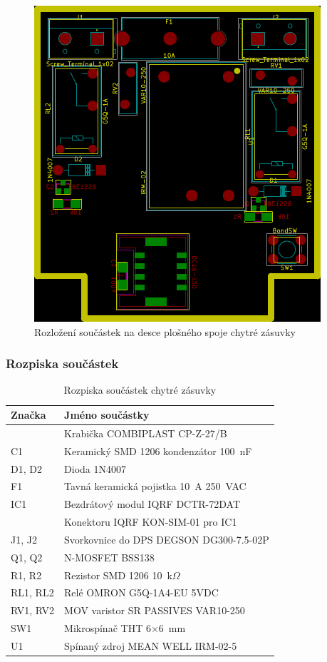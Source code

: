 \documentclass[12pt,a4paper,oneside]{article}
\begin{document}
\begin{figure}[H]
\centering
\label{fig:components}
\includegraphics{img/components.pdf}
\caption{Rozložení součástek na desce plošného spoje chytré zásuvky}
\end{figure}

\newpage

\subsubsection{Rozpiska součástek}

\begin{table}[H]
	\centering
	\begin{tabular}{|l|l|}
		\hline 
		\textbf{Značka} & \textbf{Jméno součástky} \\ 
		\hline 
		\hline 
		~ & Krabička COMBIPLAST CP-Z-27/B \\ 
		\hline 
		C1 & Keramický SMD 1206 kondenzátor 100~nF \\ 
		\hline 
		D1, D2 & Dioda 1N4007 \\ 
		\hline 
		F1 & Tavná keramická pojistka 10~A 250~VAC \\ 
		\hline 
		IC1 & Bezdrátový modul IQRF DCTR-72DAT \\ 
		\hline 
		~ & Konektoru IQRF KON-SIM-01 pro IC1 \\ 
		\hline 
		J1, J2 & Svorkovnice do DPS\index[zkr]{DPS!Deska plošných spojů|textit} DEGSON DG300-7.5-02P \\ 
		\hline 
		Q1, Q2 & N-MOSFET BSS138 \\ 
		\hline 
		R1, R2 & Rezistor SMD 1206 10~k$\Omega$ \\ 
		\hline 
		RL1, RL2 & Relé OMRON G5Q-1A4-EU 5VDC \\ 
		\hline 
		RV1, RV2 & MOV varistor SR PASSIVES VAR10-250 \\ 
		\hline 
		SW1 & Mikrospínač THT 6$\times$6~mm \\ 
		\hline 
		U1 & Spínaný zdroj MEAN WELL IRM-02-5 \\ 
		\hline 
	\end{tabular}
	\caption{Rozpiska součástek chytré zásuvky}\label{table:rozpiska-soucastek}
\end{table}
\end{document}
